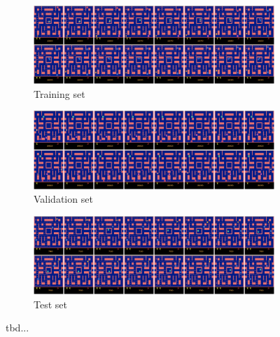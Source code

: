 \begin{figure}[htpb]
\centering
\begin{subfigure}{1.0\textwidth}
  \centering
  \includegraphics[width=1.0\linewidth]{figures/ds/pac_train_full.png}
  \caption{Training set}
  \label{fig:pac_train_full}
  \vspace{.1cm}
\end{subfigure}
\begin{subfigure}{1.0\textwidth}
  \centering
  \includegraphics[width=1.0\linewidth]{figures/ds/pac_valid_full.png}
  \caption{Validation set}
  \label{fig:pac_valid_full}
  \vspace{.1cm}
\end{subfigure}
\begin{subfigure}{1.0\textwidth}
  \centering
  \includegraphics[width=1.0\linewidth]{figures/ds/pac_test_full.png}
  \caption{Test set}
  \label{fig:pac_test_full}
\end{subfigure}
\caption[MsPacman Image Sequence Samples]{tbd...}
\label{fig:pacman_full}
\end{figure}


